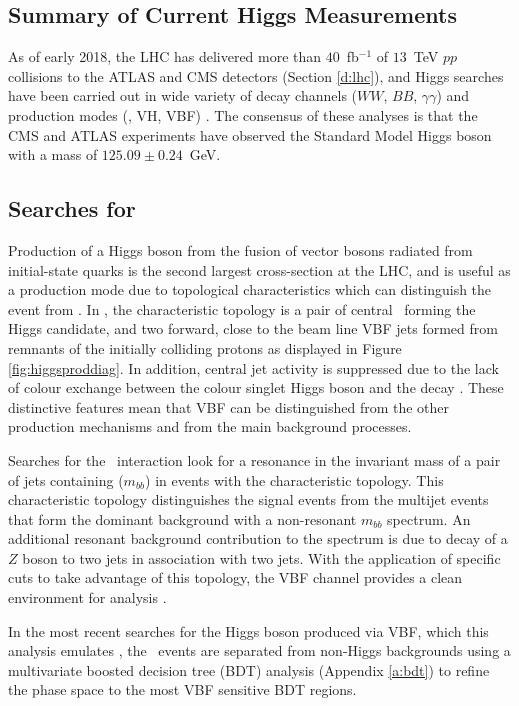 	\subsection{Summary of Current Higgs Measurements}

		As of early 2018, the LHC has delivered more than $40$~fb$^{-1}$ of $13$~TeV $pp$ collisions to the ATLAS and CMS detectors (Section \ref{d:lhc}), and Higgs searches have been carried out in wide variety of decay channels ($WW$, $BB$, $\gamma\gamma$) and production modes (\ggF, VH, VBF) \cite{pdghiggs, VBFHbb8tev, searchvh, tth}. The consensus of these analyses is that the CMS and ATLAS experiments have observed the Standard Model Higgs boson with a mass of $125.09\pm0.24$~GeV\cite{pdg}.

	\subsection{Searches for \VBFHBB}
		\label{t:VBF}

		Production of a Higgs boson from the fusion of vector bosons radiated from initial-state quarks is the second largest cross-section at the LHC, and is useful as a production mode due to topological characteristics which can distinguish the event from \ggF. In \VBFHBB, the characteristic topology is a pair of central \bjets\ forming the Higgs candidate, and two forward, close to the beam line VBF jets formed from remnants of the initially colliding protons as displayed in Figure \ref{fig:higgsproddiag}. In addition, central jet activity is suppressed due to the lack of colour exchange between the colour singlet Higgs boson and the decay \bquarks\cite{VBF2004}.  These distinctive features mean that VBF can be distinguished from the other production mechanisms and from the main background processes.

		\newpage
		Searches for the \VBFHBB\, interaction look for a resonance in the invariant mass of a pair of jets containing \bquarks ($m_{bb}$) in events with the characteristic topology. This characteristic topology distinguishes the signal events from the multijet events that form the dominant background with a non-resonant $m_{bb}$ spectrum. An additional resonant background contribution to the \mbb spectrum is due to decay of a $Z$ boson to two jets in association with two jets. With the application of specific cuts to take advantage of this topology, the VBF channel provides a clean environment for analysis \cite{pdghiggs}.

		In the most recent searches for the Higgs boson produced via VBF, which this analysis emulates \cite{VBFHbb8tev}, the \VBFHBB\, events are separated from non-Higgs backgrounds using a multivariate boosted decision tree (BDT) analysis (Appendix \ref{a:bdt}) to refine the phase space to the most VBF sensitive BDT regions.


\endinput
